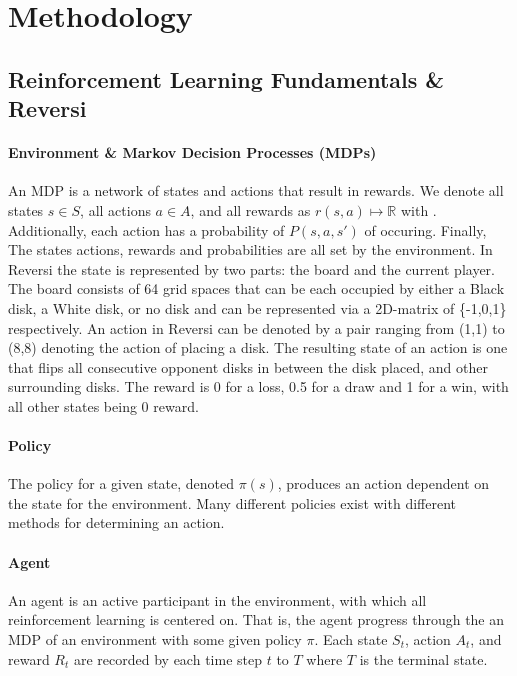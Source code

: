 \documentclass[../report.tex]{subfiles}
\begin{document}

\section{Methodology}

\subsection{Reinforcement Learning Fundamentals \& Reversi}

\paragraph{Environment \& Markov Decision Processes (MDPs)}
An MDP is a network of states and actions that result in rewards. We denote all states $s\in S$, all actions $a\in A$, and all rewards as $r(s,a)\mapsto\mathbb{R}$ with . Additionally, each action has a probability of $P(s,a,s')$ of occuring. Finally, The states actions, rewards and probabilities are all set by the environment. In Reversi the state is represented by two parts: the board and the current player. The board consists of 64 grid spaces that can be each occupied by either a Black disk, a White disk, or no disk and can be represented via a 2D-matrix of \{-1,0,1\} respectively. An action in Reversi can be denoted by a pair ranging from (1,1) to (8,8) denoting the action of placing a disk. The resulting state of an action is one that flips all consecutive opponent disks in between the disk placed, and other surrounding disks. The reward is 0 for a loss, 0.5 for a draw and 1 for a win, with all other states being 0 reward. 

\paragraph{Policy}
The policy for a given state, denoted $\pi(s)$, produces an action dependent on the state for the environment. Many different policies exist with different methods for determining an action.

\paragraph{Agent}
An agent is an active participant in the environment, with which all reinforcement learning is centered on. That is, the agent progress through the an MDP of an environment with some given policy $\pi$. Each state $S_t$, action $A_t$, and reward $R_t$ are recorded by each time step $t$ to $T$ where $T$ is the terminal state.
\end{document}

